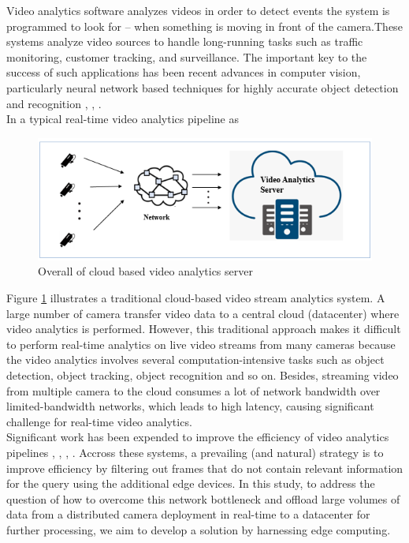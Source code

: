 Video analytics software analyzes videos in order to detect events the system is programmed to look for – when something is moving in front of the camera.These systems analyze video sources to handle long-running tasks such as traffic monitoring, customer tracking, and surveillance. The important key to the success of such applications has been recent advances in computer vision, particularly neural network based techniques for highly accurate object detection and recognition \cite{cai2015learning}, \cite{krizhevsky2017imagenet}, \cite{li2015convolutional}.\\
In a typical real-time video analytics pipeline as 
\begin{figure}
\centering
 \includegraphics[width=1.0\linewidth]{Figures/cloud.png}
 \caption{Overall of cloud based video analytics server}
 \label{fig:overall}
\end{figure}
Figure \ref{fig:overall} illustrates a traditional cloud-based video stream analytics system. A large number of camera transfer video data to a central cloud (datacenter) where video analytics is performed. However, this traditional approach makes it difficult to perform real-time analytics on live video streams from many cameras because the video analytics involves several computation-intensive tasks such as object detection, object tracking, object recognition and so on. Besides, streaming video from multiple camera to the cloud consumes a lot of network bandwidth over limited-bandwidth networks, which leads to high latency, causing significant challenge for real-time video analytics.\\
Significant work has been expended to improve the efficiency of video analytics pipelines \cite{canel2019scaling}, \cite{chen2015glimpse}, \cite{hsieh2018focus}, \cite{jiang2018chameleon}. Accross these systems, a prevailing (and natural) strategy is to improve efficiency by filtering out frames that do not contain relevant information for the query using the additional edge devices. In this study, to address the question of how to overcome this network bottleneck and offload large volumes of data from a distributed camera deployment in real-time to a datacenter for further processing, we aim to develop a solution by harnessing edge computing.
